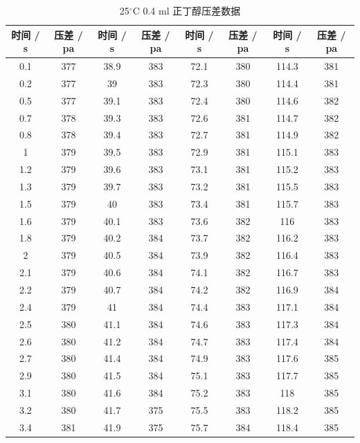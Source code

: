 \documentclass[12pt]{ctexart}
\numberwithin{equation}{section}
\begin{document}
\begin{longtable}{cc|cc|cc|cc}
    \caption{25$^\circ$C 0.4 ml 正丁醇压差数据} \\
    \hline
    时间 / s & 压差 / pa & 时间 / s & 压差 / pa & 时间 / s & 压差 / pa & 时间 / s & 压差 / pa \\
    \hline
    0.1  &  377  &  38.9  &  383  &  72.1  &  380  &  114.3  &  381  \\
0.2  &  377  &  39  &  383  &  72.3  &  380  &  114.4  &  381  \\
0.5  &  377  &  39.1  &  383  &  72.4  &  380  &  114.6  &  382  \\
0.7  &  378  &  39.3  &  383  &  72.6  &  381  &  114.7  &  382  \\
0.8  &  378  &  39.4  &  383  &  72.7  &  381  &  114.9  &  382  \\
1  &  379  &  39.5  &  383  &  72.9  &  381  &  115.1  &  383  \\
1.2  &  379  &  39.6  &  383  &  73.1  &  381  &  115.2  &  383  \\
1.3  &  379  &  39.7  &  383  &  73.2  &  381  &  115.5  &  383  \\
1.5  &  379  &  40  &  383  &  73.4  &  381  &  115.7  &  383  \\
1.6  &  379  &  40.1  &  383  &  73.6  &  382  &  116  &  383  \\
1.8  &  379  &  40.2  &  384  &  73.7  &  382  &  116.2  &  383  \\
2  &  379  &  40.5  &  384  &  73.9  &  382  &  116.4  &  383  \\
2.1  &  379  &  40.6  &  384  &  74.1  &  382  &  116.7  &  383  \\
2.2  &  379  &  40.7  &  384  &  74.2  &  382  &  116.9  &  384  \\
2.4  &  379  &  41  &  384  &  74.4  &  383  &  117.1  &  384  \\
2.5  &  380  &  41.1  &  384  &  74.6  &  383  &  117.3  &  384  \\
2.6  &  380  &  41.2  &  384  &  74.7  &  383  &  117.4  &  384  \\
2.7  &  380  &  41.4  &  384  &  74.9  &  383  &  117.6  &  385  \\
2.9  &  380  &  41.5  &  384  &  75.1  &  383  &  117.7  &  385  \\
3.1  &  380  &  41.6  &  384  &  75.2  &  383  &  118  &  385  \\
3.2  &  380  &  41.7  &  375  &  75.5  &  383  &  118.2  &  385  \\
3.4  &  381  &  41.9  &  375  &  75.7  &  384  &  118.4  &  385  \\

\end{longtable}
\end{document}
